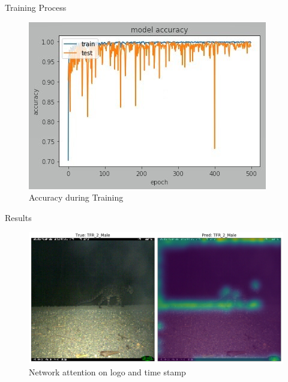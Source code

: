 \documentclass[10pt]{beamer}
\begin{document}
\begin{frame}{Training Process}
	\centering
	\begin{figure}
		\includegraphics[width=.9\columnwidth,height=\textheight,keepaspectratio]{images/Pretrain_acc_ResNet50_cropped_heavy_augment_lr0_0001.jpg}
		\caption{Accuracy during Training}
	\end{figure}
\end{frame}



\begin{frame}{Results}
	\begin{figure}
		\includegraphics[width=\columnwidth]{images/Attention_Leo_Stamp2.png}
		\caption{Network attention on logo and time stamp}
	\end{figure}
\end{frame}
\end{document}
